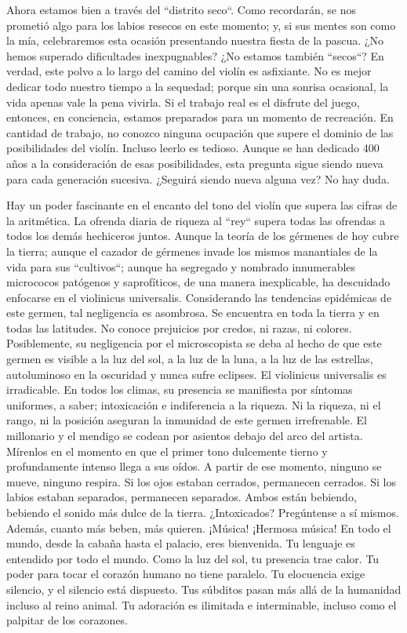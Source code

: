 \documentclass[12pt]{book}
\begin{document}
Ahora estamos bien a través del ``distrito seco``. Como recordarán, se nos prometió algo para los labios resecos en este momento; y, si sus mentes son como la mía, celebraremos esta ocasión presentando nuestra fiesta de la pascua. ¿No hemos superado dificultades inexpugnables? ¿No estamos también ``secos``? En verdad, este polvo a lo largo del camino del violín es asfixiante. No es mejor dedicar todo nuestro tiempo a la sequedad; porque sin una sonrisa ocasional, la vida apenas vale la pena vivirla. Si el trabajo real es el disfrute del juego, entonces, en conciencia, estamos preparados para un momento de recreación. En cantidad de trabajo, no conozco ninguna ocupación que supere el dominio de las posibilidades del violín. Incluso leerlo es tedioso. Aunque se han dedicado 400 años a la consideración de esas posibilidades, esta pregunta sigue siendo nueva para cada generación sucesiva. ¿Seguirá siendo nueva alguna vez? No hay duda.

Hay un poder fascinante en el encanto del tono del violín que supera las cifras de la aritmética. La ofrenda diaria de riqueza al ``rey`` supera todas las ofrendas a todos los demás hechiceros juntos. Aunque la teoría de los gérmenes de hoy cubre la tierra; aunque el cazador de gérmenes invade los mismos manantiales de la vida para sus ``cultivos``; aunque ha segregado y nombrado innumerables micrococos patógenos y saprofíticos, de una manera inexplicable, ha descuidado enfocarse en el violinicus universalis. Considerando las tendencias epidémicas de este germen, tal negligencia es asombrosa. Se encuentra en toda la tierra y en todas las latitudes. No conoce prejuicios por credos, ni razas, ni colores. Posiblemente, su negligencia por el microscopista se deba al hecho de que este germen es visible a la luz del sol, a la luz de la luna, a la luz de las estrellas, autoluminoso en la oscuridad y nunca sufre eclipses. El violinicus universalis es irradicable. En todos los climas, su presencia se manifiesta por síntomas uniformes, a saber; intoxicación e indiferencia a la riqueza. Ni la riqueza, ni el rango, ni la posición aseguran la inmunidad de este germen irrefrenable. El millonario y el mendigo se codean por asientos debajo del arco del artista. Mírenlos en el momento en que el primer tono dulcemente tierno y profundamente intenso llega a sus oídos. A partir de ese momento, ninguno se mueve, ninguno respira. Si los ojos estaban cerrados, permanecen cerrados. Si los labios estaban separados, permanecen separados. Ambos están bebiendo, bebiendo el sonido más dulce de la tierra. ¿Intoxicados? Pregúntense a sí mismos. Además, cuanto más beben, más quieren. ¡Música! ¡Hermosa música! En todo el mundo, desde la cabaña hasta el palacio, eres bienvenida. Tu lenguaje es entendido por todo el mundo. Como la luz del sol, tu presencia trae calor. Tu poder para tocar el corazón humano no tiene paralelo. Tu elocuencia exige silencio, y el silencio está dispuesto. Tus súbditos pasan más allá de la humanidad incluso al reino animal. Tu adoración es ilimitada e interminable, incluso como el palpitar de los corazones.
\end{document}
